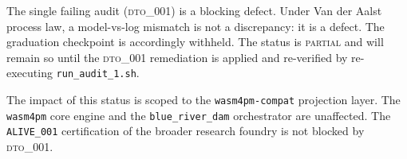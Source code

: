 The single failing audit (\textsc{dto\_001}) is a blocking defect. Under Van der
Aalst process law, a model-vs-log mismatch is not a discrepancy: it is a defect.
The graduation checkpoint is accordingly withheld. The status is \textsc{partial}
and will remain so until the \textsc{dto\_001} remediation is applied and
re-verified by re-executing \texttt{run\_audit\_1.sh}.

The impact of this status is scoped to the \texttt{wasm4pm-compat} projection
layer. The \texttt{wasm4pm} core engine and the \texttt{blue\_river\_dam}
orchestrator are unaffected. The \texttt{ALIVE\_001} certification of the broader
research foundry is not blocked by \textsc{dto\_001}.
